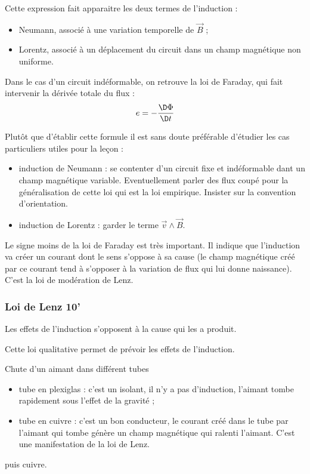 Cette expression fait apparaitre les deux termes de l'induction :
\begin{itemize}
\item Neumann, associé à une variation temporelle de $\overrightarrow{B}$ ;
\item Lorentz, associé à un déplacement du circuit dans un champ magnétique non uniforme.
\end{itemize}

Dans le cas d'un circuit indéformable, on retrouve la loi de Faraday, qui fait intervenir la dérivée totale du flux :
\begin{equation}
e = - \frac{\D \Phi}{\D t}
\end{equation}

Plutôt que d'établir cette formule il est sans doute préférable d'étudier les cas particuliers utiles pour la leçon :
\begin{itemize}
\item induction de Neumann : se contenter d'un circuit fixe et indéformable dant un champ magnétique variable.
Eventuellement parler des flux coupé pour la généralisation de cette loi qui est la loi empirique.
Insister sur la convention d'orientation.
\item induction de Lorentz : garder le terme $\overrightarrow{v}\wedge\overrightarrow{B}$.
\end{itemize}

\begin{transition}
Le signe moins de la loi de Faraday est très important.
Il indique que l'induction va créer un courant dont le sens s'oppose à sa cause (le champ magnétique créé par ce courant tend à s'opposer à la variation de flux qui lui donne naissance).
C'est la loi de modération de Lenz.
\end{transition}

\subsubsection{Loi de Lenz 10'}

Les effets de l'induction s'opposent à la cause qui les a produit.

Cette loi qualitative permet de prévoir les effets de l'induction.

\begin{experience}
Chute d'un aimant dans différent tubes
\begin{itemize}
\item tube en plexiglas : c'est un isolant, il n'y a pas d'induction, l'aimant tombe rapidement sous l'effet de la gravité ;
\item tube en cuivre : c'est un bon conducteur, le courant créé dans le tube par l'aimant qui tombe génère un champ magnétique qui ralenti l'aimant.
C'est une manifestation de la loi de Lenz.
\end{itemize}  puis cuivre.
\end{experience}

